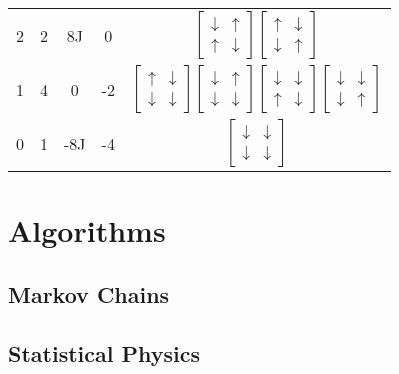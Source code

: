 \documentclass[%
reprint,
nofootinbib,
amsmath,amssymb,
aps,
]{revtex4-1}
\begin{document}
\begin{table}
\begin{tabular}{|c|c|c|c|c|}
	2 & 2 & 8J & 0&$\begin{bmatrix}\downarrow & \uparrow \\ \uparrow&\downarrow\end{bmatrix}\begin{bmatrix}\uparrow & \downarrow \\ \downarrow&\uparrow\end{bmatrix}$\\
	1 & 4 & 0 & -2&$\begin{bmatrix}\uparrow & \downarrow \\ \downarrow&\downarrow\end{bmatrix}\begin{bmatrix}\downarrow & \uparrow \\ \downarrow&\downarrow\end{bmatrix}\begin{bmatrix}\downarrow & \downarrow \\ \uparrow&\downarrow\end{bmatrix}\begin{bmatrix}\downarrow & \downarrow \\ \downarrow&\uparrow\end{bmatrix}$\\
	0 & 1 & -8J & -4&$\begin{bmatrix}\downarrow & \downarrow \\ \downarrow&\downarrow\end{bmatrix}$\\
	\hline
\end{tabular}
\end{table}


\section{Algorithms}%
\subsection{Markov Chains}

\subsection{Statistical Physics}
\end{document}
